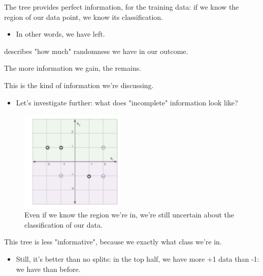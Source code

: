         The tree provides perfect information, for  the training data: if we know the region of our data point, we know its classification.
        
        \begin{itemize}
            \item In other words, we have  left.\\
        \end{itemize}

        \begin{definition}
             describes "how much" randomness we have in our outcome. 

            The more information we gain, the  remains. 
        \end{definition}
        
        This is the kind of information we're discussing.

        \begin{itemize}
            \item Let's investigate further: what does "incomplete" information look like? 
        \end{itemize}


        \begin{figure}[H]
            \centering
            \includegraphics[width=50mm,scale=0.5]{images/nonparametric_images/x2_split.png}
            \caption*{Even if we know the region we're in, we're still uncertain about the classification of our data.}
        \end{figure}

        This tree is less "informative", because we  exactly what class we're in. 

        \begin{itemize}
            \item Still, it's better than no splits: in the top half, we have more +1 data than -1: we have  than before.
                \\
        \end{itemize}

